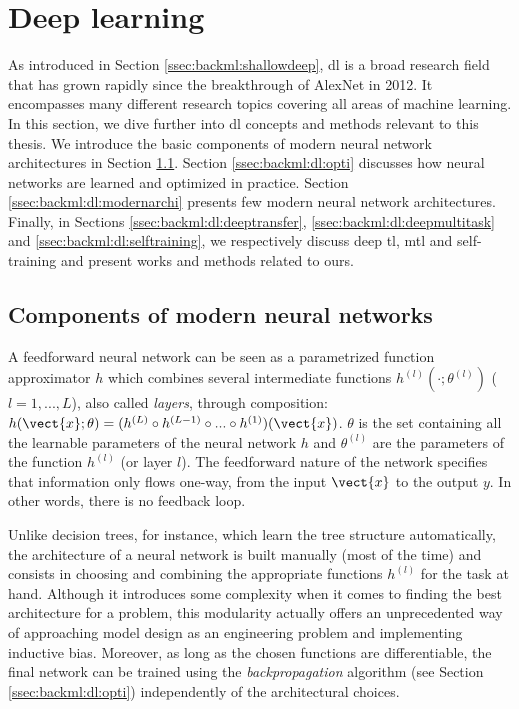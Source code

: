 \section{Deep learning}
\label{sec:backml:deeplearning}

As introduced in Section \ref{ssec:backml:shallowdeep}, \acrlong{dl} is a broad
research field that has grown rapidly since the breakthrough of AlexNet in 2012.
It encompasses many different research topics covering all areas of machine
learning. In this section, we dive further into \acrlong{dl} concepts and
methods relevant to this thesis. We introduce the basic components of modern neural
network architectures in Section \ref{ssec:backml:dp:components}. Section
\ref{ssec:backml:dl:opti} discusses how neural networks are learned and optimized
in practice. Section \ref{ssec:backml:dl:modernarchi} presents few modern neural
network architectures. Finally, in Sections \ref{ssec:backml:dl:deeptransfer}, \ref{ssec:backml:dl:deepmultitask} and \ref{ssec:backml:dl:selftraining}, we
respectively discuss deep \acrlong{tl}, \acrlong{mtl} and self-training and present works and methods related to ours. 

\subsection{Components of modern neural networks}
\label{ssec:backml:dp:components}

A feedforward neural network can be seen as a parametrized function approximator
$h$ which combines several intermediate functions $h^{(l)}(\cdot; \theta^{(l)})$
($l=1, ..., L$), also called \textit{layers}, through composition:
$h(\vect{x}; \theta) = (h^{(L)} \circ h^{(L-1)} \circ ... \circ h^{(1)})(\vect{x})$.
$\theta$ is the set containing all the learnable parameters of the neural network
$h$ and $\theta^{(l)}$ are the parameters of the function $h^{(l)}$ (or layer
$l$). The feedforward nature of the network specifies that information only flows
one-way, from the input $\vect{x}$ to the output $y$. In other words, there is no
feedback loop.

Unlike decision trees, for instance, which learn the tree structure automatically,
the architecture of a neural network is built manually (most of the time) and
consists in choosing and combining the appropriate functions $h^{(l)}$ for the
task at hand. Although it introduces some complexity when it comes to finding the
best architecture for a problem, this modularity actually offers an unprecedented
way of approaching model design as an engineering problem and implementing inductive
bias. Moreover, as long as the chosen functions are differentiable, the final
network can be trained using the \textit{backpropagation} algorithm (see Section
\ref{ssec:backml:dl:opti}) independently of the architectural choices.

